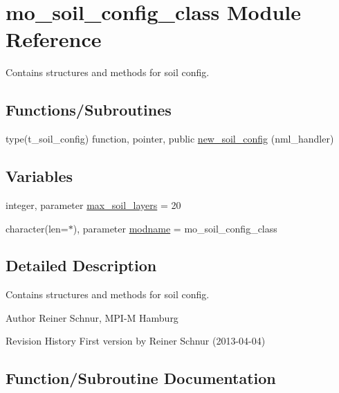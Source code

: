 \hypertarget{namespacemo__soil__config__class}{}\section{mo\+\_\+soil\+\_\+config\+\_\+class Module Reference}
\label{namespacemo__soil__config__class}


Contains structures and methods for soil config.  


\subsection*{Functions/\+Subroutines}
\begin{DoxyCompactItemize}
\item 
type(t\+\_\+soil\+\_\+config) function, pointer, public \hyperlink{namespacemo__soil__config__class_a5093e53abf20433b31866a3ccf4a9632}{new\+\_\+soil\+\_\+config} (nml\+\_\+handler)
\end{DoxyCompactItemize}
\subsection*{Variables}
\begin{DoxyCompactItemize}
\item 
integer, parameter \hyperlink{namespacemo__soil__config__class_a3a98563fab1a9b484ef3c2d6120c93e8}{max\+\_\+soil\+\_\+layers} = 20
\item 
character(len=$\ast$), parameter \hyperlink{namespacemo__soil__config__class_a6b8b4145e195e3615319ed71a4d9d1bb}{modname} = \textquotesingle{}mo\+\_\+soil\+\_\+config\+\_\+class\textquotesingle{}
\end{DoxyCompactItemize}


\subsection{Detailed Description}
Contains structures and methods for soil config. 

\begin{DoxyAuthor}{Author}
Reiner Schnur, M\+P\+I-\/\+M Hamburg
\end{DoxyAuthor}
\begin{DoxyParagraph}{Revision History}
First version by Reiner Schnur (2013-\/04-\/04) 
\end{DoxyParagraph}


\subsection{Function/\+Subroutine Documentation}
\hypertarget{namespacemo__soil__config__class_a5093e53abf20433b31866a3ccf4a9632}{}
